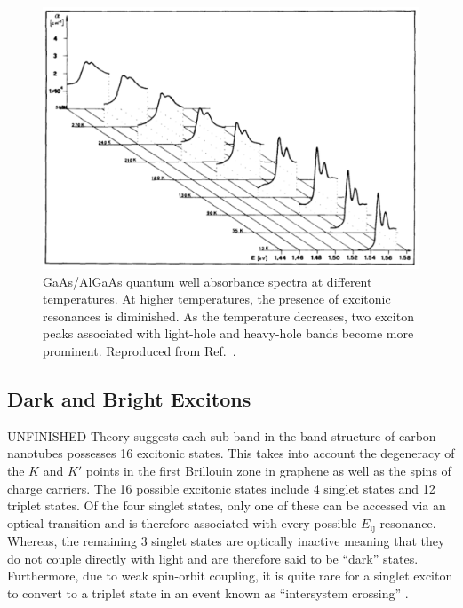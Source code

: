 \begin{figure}[h]
	\centering
	\includegraphics[scale=0.55]{images/chapter_optical_props/gaas_absorbance_filipowicz}
	\caption{GaAs/AlGaAs quantum well absorbance spectra at different temperatures. At higher temperatures, the presence of excitonic resonances is diminished. As the temperature decreases, two exciton peaks associated with light-hole and heavy-hole bands become more prominent. Reproduced from Ref.\ \cite{filipowicz1990temperature}.}
	\label{fig:gaas_vs_cnt_absorbance}
\end{figure}

\subsection{Dark and Bright Excitons}

{\color{red} UNFINISHED} Theory suggests each sub-band in the band structure of carbon nanotubes possesses 16 excitonic states. This takes into account the degeneracy of the $K$ and $K'$ points in the first Brillouin zone in graphene as well as the spins of charge carriers. The 16 possible excitonic states include 4 singlet states and 12 triplet states. Of the four singlet states, only one of these can be accessed via an optical transition and is therefore associated with every possible $E_\text{ij}$ resonance. Whereas, the remaining 3 singlet states are optically inactive meaning that they do not couple directly with light and are therefore said to be  ``dark'' states. Furthermore, due to weak spin-orbit coupling, it is quite rare for a singlet exciton to convert to a triplet state in an event known as ``intersystem crossing'' \cite{amori2018excitons}. 

